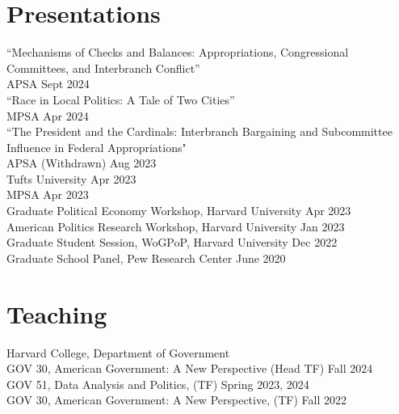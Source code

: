 \documentclass[margin, line]{res}
\begin{document}
\begin{resume}
\section{Presentations}
``Mechanisms of Checks and Balances: Appropriations, Congressional Committees, and Interbranch Conflict''\\
\hspace*{5mm} APSA \hfill Sept 2024\\
``Race in Local Politics: A Tale of Two Cities''\\
\hspace*{5mm} MPSA \hfill Apr 2024\\
``The President and the Cardinals: Interbranch Bargaining and Subcommittee Influence in Federal Appropriations"\\
\hspace*{5mm} APSA (Withdrawn) \hfill Aug 2023\\
\hspace*{5mm} Tufts University \hfill Apr 2023\\
\hspace*{5mm} MPSA \hfill Apr 2023\\
\hspace*{5mm} Graduate Political Economy Workshop, Harvard University \hfill Apr 2023\\
\hspace*{5mm} American Politics Research Workshop, Harvard University \hfill Jan 2023\\
\hspace*{5mm} Graduate Student Session, WoGPoP, Harvard University \hfill Dec 2022\\
Graduate School Panel, Pew Research Center  \hfill June 2020

\section{Teaching}
Harvard College, Department of Government\\
\hspace*{5mm} GOV 30, American Government: A New Perspective (Head TF) \hfill Fall 2024\\
\hspace*{5mm} GOV 51, Data Analysis and Politics, (TF) \hfill Spring 2023, 2024\\
\hspace*{5mm} GOV 30, American Government: A New Perspective,  (TF) \hfill Fall 2022


\end{resume}
\end{document}
